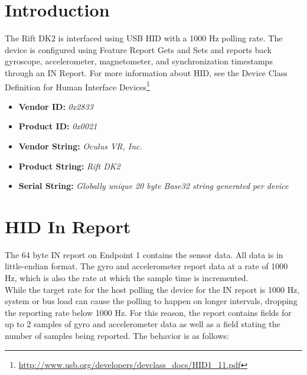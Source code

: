 \documentclass[letterpaper]{article}
\begin{document}
\newpage

\section{Introduction}

The Rift DK2 is interfaced using USB HID with a 1000 Hz polling rate.  The device is configured using Feature Report Gets and Sets and reports back gyroscope, accelerometer, magnetometer, and synchronization timestamps through an IN Report.  For more information about HID, see the Device Class Definition for Human Interface Devices\footnote{\url{http://www.usb.org/developers/devclass_docs/HID1_11.pdf}}

\begin{itemize}
  \item {\bfseries Vendor ID:} {\em 0x2833}
  \item {\bfseries Product ID:} {\em 0x0021}
  \item {\bfseries Vendor String:} {\em Oculus VR, Inc.}
  \item {\bfseries Product String:} {\em Rift DK2}
  \item {\bfseries Serial String:} {\em Globally unique 20 byte Base32 string generated per device}
\end{itemize}

\newpage

\section{HID In Report}

The 64 byte IN report on Endpoint 1 contains the sensor data.  All data is in little-endian format.  The gyro and accelerometer report data at a rate of 1000 Hz, which is also the rate at which the sample time is incremented.\\

While the target rate for the host polling the device for the IN report is 1000 Hz, system or bus load can cause the polling to happen on longer intervals, dropping the reporting rate below 1000 Hz.  For this reason, the report contains fields for up to 2 samples of gyro and accelerometer data as well as a field stating the number of samples being reported.  The behavior is as follows:\\
\end{document}
